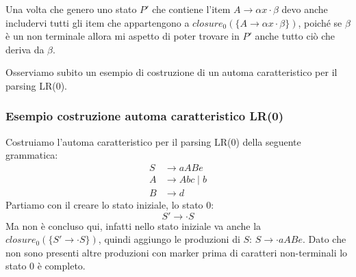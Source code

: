\documentclass[class=book, crop=false, oneside, 12pt]{standalone}
\begin{document}
Una volta che genero uno stato \(P'\) che contiene l'item \(A \to \alpha x \cdot \beta\) devo anche includervi tutti gli item che appartengono a \(closure_0 (\{ A \to \alpha x \cdot \beta \})\), poiché se \(\beta\) è un non terminale allora mi aspetto di poter trovare in \(P'\)  anche tutto ciò che deriva da \(\beta\).

Osserviamo subito un esempio di costruzione  di un automa caratteristico per il parsing LR(0).

\subsubsection{Esempio costruzione automa caratteristico LR(0)}
\label{esercizio_costruzione_automa_lr0}
Costruiamo l'automa caratteristico per il parsing LR(0) della seguente grammatica:
\begin{align*}
    S &\to aABe \\
    A &\to Abc \mid b \\
    B &\to d
\end{align*}
Partiamo con il creare lo stato iniziale, lo stato 0:
\begin{equation*}
    S' \to \cdot S
\end{equation*}
Ma non è concluso qui, infatti nello stato iniziale va anche la \(closure_0(\{ S' \to \cdot S \})\), quindi aggiungo le produzioni di \(S\): \(S \to \cdot aABe\).
Dato che non sono presenti altre produzioni con marker prima di caratteri non-terminali lo stato 0 è completo.
\end{document}
